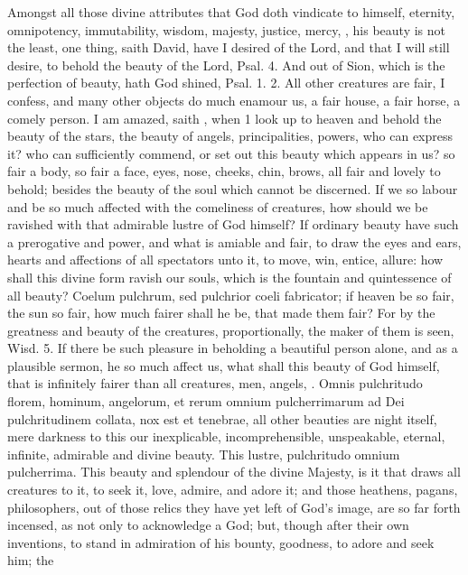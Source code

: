 {Amongst all those divine attributes that God doth vindicate to himself,
eternity, omnipotency, immutability, wisdom, majesty, justice, mercy,
\etc{}, his beauty is not the least, one thing, saith David, have I
desired of the Lord, and that I will still desire, to behold the beauty
of the Lord, Psal.  4. And out of Sion, which is the perfection
of beauty, hath God shined, Psal. 1. 2. All other creatures are fair, I
confess, and many other objects do much enamour us, a fair house, a
fair horse, a comely person. I am amazed, saith \Austin{}, when 1
look up to heaven and behold the beauty of the stars, the beauty of
angels, principalities, powers, who can express it? who can
sufficiently commend, or set out this beauty which appears in us? so
fair a body, so fair a face, eyes, nose, cheeks, chin, brows, all fair
and lovely to behold; besides the beauty of the soul which cannot be
discerned. If we so labour and be so much affected with the comeliness
of creatures, how should we be ravished with that admirable lustre of
God himself? If ordinary beauty have such a prerogative and power, and
what is amiable and fair, to draw the eyes and ears, hearts and
affections of all spectators unto it, to move, win, entice, allure: how
shall this divine form ravish our souls, which is the fountain and
quintessence of all beauty? Coelum pulchrum, sed pulchrior coeli
fabricator; if heaven be so fair, the sun so fair, how much fairer
shall he be, that made them fair? For by the greatness and beauty of
the creatures, proportionally, the maker of them is seen, Wisd. 
5. If there be such pleasure in beholding a beautiful person alone, and
as a plausible sermon, he so much affect us, what shall this beauty of
God himself, that is infinitely fairer than all creatures, men, angels,
\etc{}.  Omnis pulchritudo florem, hominum, angelorum, et rerum
omnium pulcherrimarum ad Dei pulchritudinem collata, nox est et
tenebrae, all other beauties are night itself, mere darkness to this
our inexplicable, incomprehensible, unspeakable, eternal, infinite,
admirable and divine beauty. This lustre, pulchritudo omnium
pulcherrima. This beauty and  splendour of the divine Majesty, is
it that draws all creatures to it, to seek it, love, admire, and adore
it; and those heathens, pagans, philosophers, out of those relics they
have yet left of God's image, are so far forth incensed, as not only to
acknowledge a God; but, though after their own inventions, to stand in
admiration of his bounty, goodness, to adore and seek him; the
}
